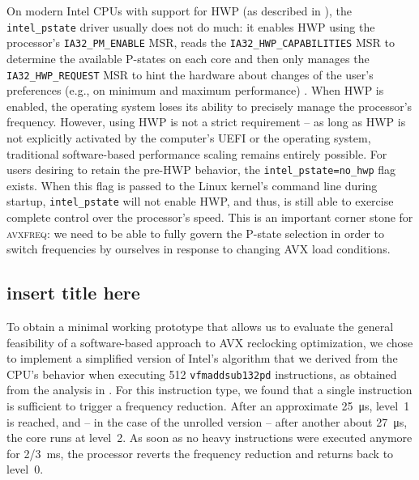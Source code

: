 On modern Intel \glspl{CPU} with support for \gls{HWP} (as described in ), the \texttt{intel\_pstate} driver usually does not do much: it enables \gls{HWP} using the processor's \texttt{IA32\_PM\_ENABLE} \gls{MSR}, reads the \texttt{IA32\_HWP\_CAPABILITIES} \gls{MSR} to determine the available \glspl{P-state} on each core and then only manages the \texttt{IA32\_HWP\_REQUEST} \gls{MSR} to hint the hardware about changes of the user's preferences (e.g., on minimum and maximum performance) \cite{intelsdmsysprogguide} \cite{intelpstate}. When \gls{HWP} is enabled, the operating system loses its ability to precisely manage the processor's frequency. However, using \gls{HWP} is not a strict requirement -- as long as \gls{HWP} is not explicitly activated by the computer's \gls{UEFI} or the operating system, traditional software-based performance scaling remains entirely possible. For users desiring to retain the pre-\gls{HWP} behavior, the \texttt{intel\_pstate=no\_hwp} flag exists. When this flag is passed to the Linux kernel's command line during startup, \texttt{intel\_pstate} will not enable \gls{HWP}, and thus, is still able to exercise complete control over the processor's speed. This is an important corner stone for \textsc{avxfreq}: we need to be able to fully govern the \gls{P-state} selection in order to switch frequencies by ourselves in response to changing \gls{AVX} load conditions.

\subsection{insert title here}

To obtain a minimal working prototype that allows us to evaluate the general feasibility of a software-based approach to \gls{AVX} reclocking optimization, we chose to implement a simplified version of Intel's algorithm that we derived from the \gls{CPU}'s behavior when executing \SI{512}{\bit} \texttt{vfmaddsub132pd} instructions, as obtained from the analysis in . For this instruction type, we found that a single instruction is sufficient to trigger a frequency reduction. After an approximate \SI{25}{\micro\second}, level~1 is reached, and -- in the case of the unrolled version -- after another about \SI{27}{\micro\second}, the core runs at level~2. As soon as no heavy instructions were executed anymore for \SI[quotient-mode=fraction]{2/3}{\milli\second}, the processor reverts the frequency reduction and returns back to level~0. %

